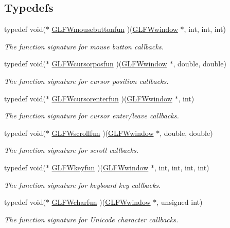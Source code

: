 \subsection*{\-Typedefs}
\begin{DoxyCompactItemize}
\item 
typedef void($\ast$ \hyperlink{group__input_ga1e008c7a8751cea648c8f42cc91104cf}{\-G\-L\-F\-Wmousebuttonfun} )(\hyperlink{group__window_ga3c96d80d363e67d13a41b5d1821f3242}{\-G\-L\-F\-Wwindow} $\ast$, int, int, int)
\begin{DoxyCompactList}\small\item\em \-The function signature for mouse button callbacks. \end{DoxyCompactList}\item 
typedef void($\ast$ \hyperlink{group__input_ga592fbfef76d88f027cb1bc4c36ebd437}{\-G\-L\-F\-Wcursorposfun} )(\hyperlink{group__window_ga3c96d80d363e67d13a41b5d1821f3242}{\-G\-L\-F\-Wwindow} $\ast$, double, double)
\begin{DoxyCompactList}\small\item\em \-The function signature for cursor position callbacks. \end{DoxyCompactList}\item 
typedef void($\ast$ \hyperlink{group__input_ga762d898d9b0241d7e3e3b767c6cf318f}{\-G\-L\-F\-Wcursorenterfun} )(\hyperlink{group__window_ga3c96d80d363e67d13a41b5d1821f3242}{\-G\-L\-F\-Wwindow} $\ast$, int)
\begin{DoxyCompactList}\small\item\em \-The function signature for cursor enter/leave callbacks. \end{DoxyCompactList}\item 
typedef void($\ast$ \hyperlink{group__input_ga6228cdf94d28fbd3a9a1fbb0e5922a8a}{\-G\-L\-F\-Wscrollfun} )(\hyperlink{group__window_ga3c96d80d363e67d13a41b5d1821f3242}{\-G\-L\-F\-Wwindow} $\ast$, double, double)
\begin{DoxyCompactList}\small\item\em \-The function signature for scroll callbacks. \end{DoxyCompactList}\item 
typedef void($\ast$ \hyperlink{group__input_ga592dd1919f8a1dc7576b13cdd8b7b695}{\-G\-L\-F\-Wkeyfun} )(\hyperlink{group__window_ga3c96d80d363e67d13a41b5d1821f3242}{\-G\-L\-F\-Wwindow} $\ast$, int, int, int, int)
\begin{DoxyCompactList}\small\item\em \-The function signature for keyboard key callbacks. \end{DoxyCompactList}\item 
typedef void($\ast$ \hyperlink{group__input_ga1103f1876518acecb5976f6b307c51d1}{\-G\-L\-F\-Wcharfun} )(\hyperlink{group__window_ga3c96d80d363e67d13a41b5d1821f3242}{\-G\-L\-F\-Wwindow} $\ast$, unsigned int)
\begin{DoxyCompactList}\small\item\em \-The function signature for \-Unicode character callbacks. \end{DoxyCompactList}\end{DoxyCompactItemize}
